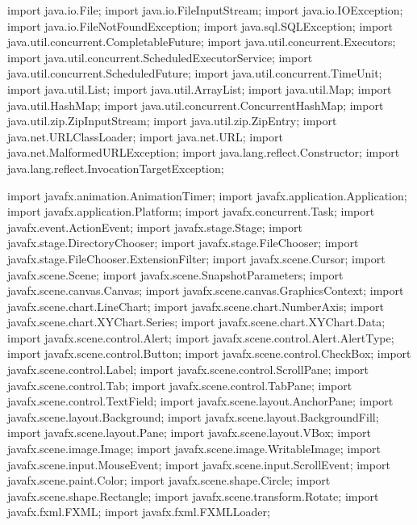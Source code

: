 \nwenddocs{}\plusendmoddef
import java.io.File;
import java.io.FileInputStream;
import java.io.IOException;
import java.io.FileNotFoundException;
import java.sql.SQLException;
import java.util.concurrent.CompletableFuture;
import java.util.concurrent.Executors;
import java.util.concurrent.ScheduledExecutorService;
import java.util.concurrent.ScheduledFuture;
import java.util.concurrent.TimeUnit;
import java.util.List;
import java.util.ArrayList;
import java.util.Map;
import java.util.HashMap;
import java.util.concurrent.ConcurrentHashMap;
import java.util.zip.ZipInputStream;
import java.util.zip.ZipEntry;
import java.net.URLClassLoader;
import java.net.URL;
import java.net.MalformedURLException;
import java.lang.reflect.Constructor;
import java.lang.reflect.InvocationTargetException;
\nwendcode{}\nwdocspar

\nwenddocs{}\plusendmoddef
import javafx.animation.AnimationTimer;
import javafx.application.Application;
import javafx.application.Platform;
import javafx.concurrent.Task;
import javafx.event.ActionEvent;
import javafx.stage.Stage;
import javafx.stage.DirectoryChooser;
import javafx.stage.FileChooser;
import javafx.stage.FileChooser.ExtensionFilter;
import javafx.scene.Cursor;
import javafx.scene.Scene;
import javafx.scene.SnapshotParameters;
import javafx.scene.canvas.Canvas;
import javafx.scene.canvas.GraphicsContext;
import javafx.scene.chart.LineChart;
import javafx.scene.chart.NumberAxis;
import javafx.scene.chart.XYChart.Series;
import javafx.scene.chart.XYChart.Data;
import javafx.scene.control.Alert;
import javafx.scene.control.Alert.AlertType;
import javafx.scene.control.Button;
import javafx.scene.control.CheckBox;
import javafx.scene.control.Label;
import javafx.scene.control.ScrollPane;
import javafx.scene.control.Tab;
import javafx.scene.control.TabPane;
import javafx.scene.control.TextField;
import javafx.scene.layout.AnchorPane;
import javafx.scene.layout.Background;
import javafx.scene.layout.BackgroundFill;
import javafx.scene.layout.Pane;
import javafx.scene.layout.VBox;
import javafx.scene.image.Image;
import javafx.scene.image.WritableImage;
import javafx.scene.input.MouseEvent;
import javafx.scene.input.ScrollEvent;
import javafx.scene.paint.Color;
import javafx.scene.shape.Circle;
import javafx.scene.shape.Rectangle;
import javafx.scene.transform.Rotate;
import javafx.fxml.FXML;
import javafx.fxml.FXMLLoader;
\nwendcode{}\nwdocspar

